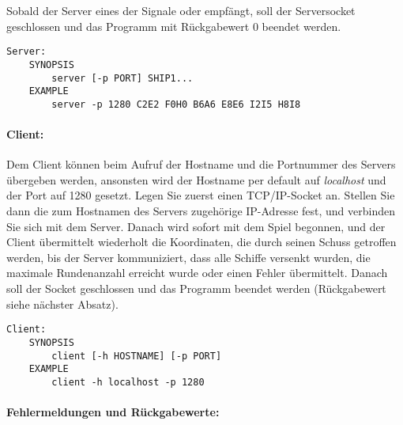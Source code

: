 
Sobald der Server eines der Signale  oder
 empfängt, soll der Serversocket geschlossen und das
Programm mit Rückgabewert 0 beendet werden.

\vspace{-10pt}
\begin{verbatim}
Server:
    SYNOPSIS
        server [-p PORT] SHIP1...
    EXAMPLE
        server -p 1280 C2E2 F0H0 B6A6 E8E6 I2I5 H8I8
\end{verbatim}

\paragraph{Client:}

Dem Client können beim Aufruf der Hostname und die Portnummer des Servers
übergeben werden, ansonsten wird der Hostname per default auf \emph{localhost}
und der Port auf 1280 gesetzt. Legen Sie zuerst einen
TCP/IP-Socket an. Stellen Sie dann die zum Hostnamen des Servers zugehörige
IP-Adresse fest, und verbinden Sie sich mit dem Server. Danach wird sofort mit
dem Spiel begonnen, und der Client übermittelt wiederholt die Koordinaten,
die durch seinen Schuss getroffen werden, bis der Server kommuniziert,
dass alle Schiffe versenkt wurden, die maximale Rundenanzahl erreicht wurde
oder einen Fehler übermittelt.
Danach soll der Socket geschlossen und das
Programm beendet werden (Rückgabewert siehe nächster Absatz).

\vspace{-10pt}
\begin{verbatim}
Client:
    SYNOPSIS
        client [-h HOSTNAME] [-p PORT]
    EXAMPLE
        client -h localhost -p 1280
\end{verbatim}

\paragraph{Fehlermeldungen und Rückgabewerte:}

